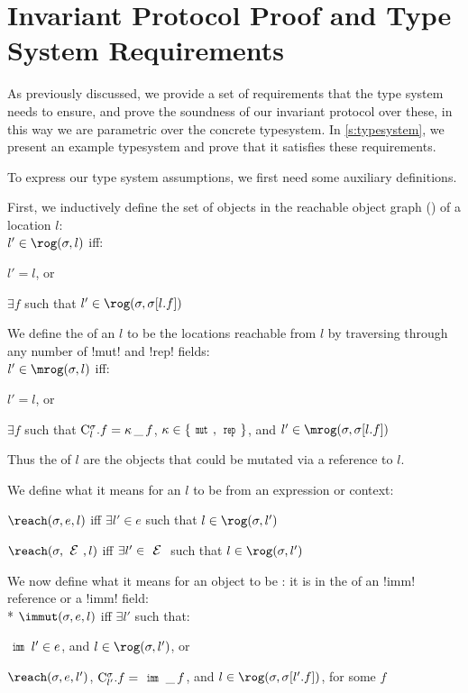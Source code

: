 \section{Invariant Protocol Proof and Type System Requirements}

\lstset{language=FortyFour} %
\label{s:proof}
As previously discussed, we provide a set of requirements that the type system needs to ensure, and prove the soundness of our invariant protocol over these,
in this way we are parametric over the concrete typesystem. In \autoref{s:typesystem}, we present an example typesystem and prove that it satisfies these requirements.

To express our type system assumptions, we first need some auxiliary definitions. 
\LS

\noindent First, we inductively define the set of objects in the reachable object graph (\rog) of a location $l$:\\
\indent $l' \in \rog(\s, l)$ iff:%
\begin{iitemize}
	\item $l' = l$, or\SS
	\item $\exists f$ such that $l' \in \rog(\s, \s[l.f])$
\end{iitemize}
\LS
We define the \mrog of an $l$ to be the locations reachable from $l$ by traversing through any number of \Q!mut! and \Q!rep! fields:\\
\indent $l' \in \mrog(\s, l)$ iff:%
\begin{iitemize}
	\item $l' = l$, or\SS
	\item $\exists f$ such that $\mathrm{C}^{\sigma}_{l}.f = {\kappa}\,\_\,f$, $\fmdf \in \{\Kw{mut},\Kw{rep}\}$, and $l' \in \mrog(\s, \s[l.f])$
\end{iitemize}
Thus the \mrog of $l$ are the objects that could be mutated via a reference to $l$.

\LS
\noindent We define what it means for an $l$ to be \reach from an expression or context:
\begin{iitemize}
\item $\reach(\s, e, l)$ iff $\exists l' \in e$ such that $l \in \rog(\s, l')$\SS
\item $\reach(\s, \E, l)$ iff $\exists l' \in \E$ such that $l \in \rog(\s, l')$
\end{iitemize}

\LS

We now define what it means for an object to be \immut: it is in the \rog of an \Q!imm! reference or a \reach \Q!imm! field:\\*
\indent $\immut(\s, e, l)$ iff $\exists l'$ such that:
\begin{iitemize}
\item $\Kw{imm}\,l' \in e$, and $l \in \rog(\s, l')$, or\SS
\item $\reach(\s, e, l')$, $\C{l'}.f = \field{\Kw{imm}}{\_}{f}$, and $l \in \rog(\s, \s[l'.f])$, for some $f$
\end{iitemize}

